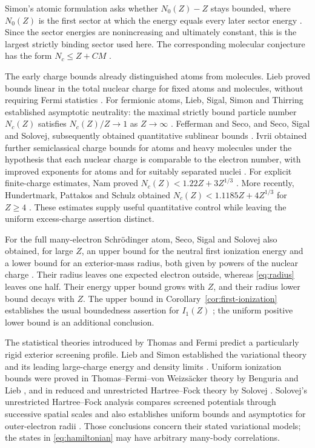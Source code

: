 Simon's atomic formulation asks whether $N_0(Z)-Z$ stays bounded, where
$N_0(Z)$ is the first sector at which the energy equals every later sector
energy \citep[Problem~9]{Simon2000}. Since the sector energies are
nonincreasing and ultimately constant, this is the largest strictly
binding sector used here. The corresponding molecular conjecture has
the form $N_c\le Z+CM$ \citep[Section~2.1.2]{Lewin2025OpenProblems}.

The early charge bounds already distinguished atoms from molecules.
Lieb proved bounds linear in the total nuclear charge for fixed atoms and
molecules, without requiring Fermi statistics \citep{Lieb1984}.
For fermionic atoms, Lieb, Sigal, Simon and Thirring established asymptotic
neutrality: the maximal strictly bound particle number $N_c(Z)$ satisfies
$N_c(Z)/Z\to1$ as $Z\to\infty$ \citep{LSST1984,LSST1988}.
Fefferman and Seco, and Seco, Sigal and Solovej, subsequently obtained
quantitative sublinear bounds \citep{FeffermanSeco1990,SecoSigalSolovej1990}.
Ivrii obtained further semiclassical charge bounds for atoms and heavy
molecules under the hypothesis that each nuclear charge is comparable
to the electron number, with improved exponents for atoms and for
suitably separated nuclei \citep[Theorem~5.2.1]{Ivrii2012}.
For explicit finite-charge estimates, Nam proved
$N_c(Z)<1.22Z+3Z^{1/3}$ \citep{Nam2012}.
More recently, Hundertmark, Pattakos and Schulz obtained
$N_c(Z)<1.1185Z+4Z^{1/3}$ for $Z\ge4$ \citep{HPS2025}.
These estimates supply useful quantitative control while leaving the
uniform excess-charge assertion distinct.

For the full many-electron Schr\"odinger atom, Seco, Sigal and Solovej
also obtained, for large $Z$, an upper bound for the neutral first ionization energy
and a lower bound for an exterior-mass radius, both given by powers of
the nuclear charge \citep[Theorems~1 and~3]{SecoSigalSolovej1990}.
Their radius leaves one expected electron outside, whereas
\eqref{eq:radius} leaves one half. Their energy upper bound grows with
$Z$, and their radius lower bound decays with $Z$.
The upper bound in Corollary~\ref{cor:first-ionization} establishes the
usual boundedness assertion for $I_1(Z)$
\citep[Section~2]{Solovej2016}; the uniform positive lower bound is an
additional conclusion.

The statistical theories introduced by Thomas and Fermi
\citep{Thomas1927,Fermi1927} predict a particularly rigid exterior
screening profile. Lieb and Simon established the variational theory and
its leading large-charge energy and density limits
\citep{LiebSimon1973,LiebSimon1977}. Uniform ionization bounds were
proved in Thomas--Fermi--von Weizs\"acker theory by Benguria and Lieb
\citep{BenguriaLieb1985}, and in reduced and unrestricted Hartree--Fock
theory by Solovej \citep{Solovej1991,Solovej2003}. Solovej's unrestricted
Hartree--Fock analysis compares screened potentials through successive
spatial scales and also establishes uniform bounds and asymptotics for
outer-electron radii \citep[Definition~1.2, Theorem~1.5, and Sections~10--13]{Solovej2003}.
Those conclusions concern their stated variational models; the states in
\eqref{eq:hamiltonian} may have arbitrary many-body correlations.

